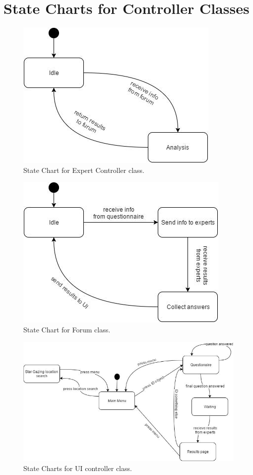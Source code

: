\documentclass[]{article}
\begin{document}

\section{State Charts for Controller Classes}
\label{sec:state_charts_for_controller_classes}

\begin{figure}[!h]
    \caption{State Chart for Expert Controller class.}
    \centering
    \includegraphics[scale=0.5]{expertcontroller.jpg}
\end{figure}

\begin{figure}[!h]
    \caption{State Chart for Forum class.}
    \centering
    \includegraphics[scale=0.5]{forum.jpg}
\end{figure}

\begin{figure}[!h]
    \caption{State Charts for UI controller class.}
    \centering
    \includegraphics[scale=0.5]{uicontroller.jpg}
\end{figure}
\end{document}
